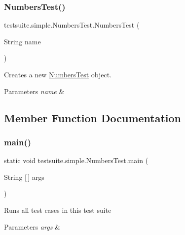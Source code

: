 \subsubsection{\texorpdfstring{Numbers\+Test()}{NumbersTest()}}
{\footnotesize\ttfamily testsuite.\+simple.\+Numbers\+Test.\+Numbers\+Test (\begin{DoxyParamCaption}\item[{String}]{name }\end{DoxyParamCaption})}

Creates a new \mbox{\hyperlink{classtestsuite_1_1simple_1_1_numbers_test}{Numbers\+Test}} object.


\begin{DoxyParams}{Parameters}
{\em name} & \\
\hline
\end{DoxyParams}


\subsection{Member Function Documentation}
\mbox{\label{classtestsuite_1_1simple_1_1_numbers_test_a71ce4bec6ea91a72a2818b53e626d99b}} 
\subsubsection{\texorpdfstring{main()}{main()}}
{\footnotesize\ttfamily static void testsuite.\+simple.\+Numbers\+Test.\+main (\begin{DoxyParamCaption}\item[{String \mbox{[}$\,$\mbox{]}}]{args }\end{DoxyParamCaption})\hspace{0.3cm}{\ttfamily [static]}}

Runs all test cases in this test suite


\begin{DoxyParams}{Parameters}
{\em args} & \\
\hline
\end{DoxyParams}
\mbox{\label{classtestsuite_1_1simple_1_1_numbers_test_a6cdec77fd619aab7060428194f75d50b}} 
